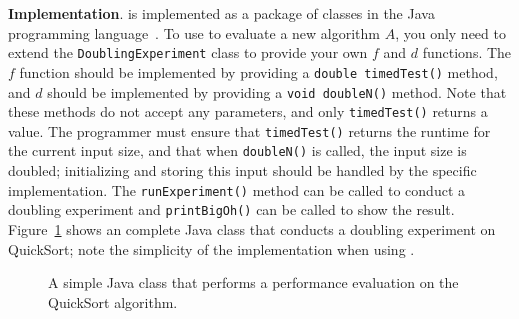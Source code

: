 
    {\bf Implementation}.  \toolname is implemented as a package of
    classes in the Java programming language~\cite{tool}.  To use \toolname to
    evaluate a new algorithm $A$, you only need to extend the
    \texttt{DoublingExperiment} class to provide your own $f$ and $d$
    functions.  The $f$ function should be implemented by providing a
    \texttt{double timedTest()} method, and $d$ should be implemented by
    providing a \texttt{void doubleN()} method. Note that these methods
    do not accept any parameters, and only \texttt{timedTest()} returns
    a value. The programmer must ensure that \texttt{timedTest()}
    returns the runtime for the current input size, and that when
    \texttt{doubleN()} is called, the input size is doubled;
    initializing and storing this input should be handled by the specific
    implementation. The \texttt{runExperiment()} method can be called to
    conduct a doubling experiment and \texttt{printBigOh()} can be
    called to show the result. Figure~\ref{fig:qsprogram} shows an
    complete Java class that conducts a doubling experiment on
    QuickSort; note the simplicity of the implementation when using
    \toolname.



    \begin{figure}[t]
    
    \vspace{-0.15in}
    \caption{A simple Java class that performs a performance evaluation
    on the QuickSort algorithm.}\vspace{-0.20in}
    \label{fig:qsprogram}
    \end{figure}

